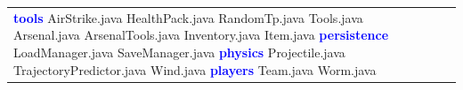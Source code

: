 \documentclass[a4paper, 12pt]{article}
\begin{document}
\begin{landscape}
\begin{table}[H]
\begin{tabular}{|p{5.5cm}|p{5.5cm}|p{5.5cm}|p{5.5cm}|}
                            \hspace*{0.4cm} \textcolor{blue}{\textbf{tools}} \newline
                                \hspace*{0.8cm} AirStrike.java \newline
                                \hspace*{0.8cm} HealthPack.java \newline
                                \hspace*{0.8cm} RandomTp.java \newline
                                \hspace*{0.8cm} Tools.java \newline
                            \hspace*{0.4cm} Arsenal.java \newline
                            \hspace*{0.4cm} ArsenalTools.java \newline
                            \hspace*{0.4cm} Inventory.java \newline
                            \hspace*{0.4cm} Item.java \newline
                        \textcolor{blue}{\textbf{persistence}} \newline
                            \hspace*{0.4cm} LoadManager.java \newline
                            \hspace*{0.4cm} SaveManager.java \newline
                        \textcolor{blue}{\textbf{physics}} \newline
                            \hspace*{0.4cm} Projectile.java \newline
                            \hspace*{0.4cm} TrajectoryPredictor.java \newline
                            \hspace*{0.4cm} Wind.java \newline
                        \textcolor{blue}{\textbf{players}} \newline
                            \hspace*{0.4cm} Team.java \newline
                            \hspace*{0.4cm} Worm.java \newline

\end{tabular}
\end{table}
\end{landscape}
\end{document}
